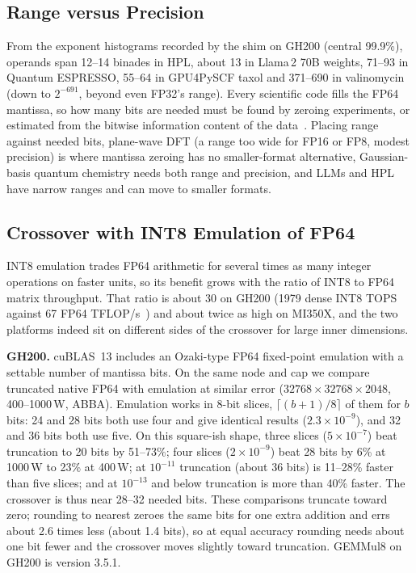 \documentclass[conference]{IEEEtran}
\newcommand{\W}{\,W}
\newcommand{\ee}[2]{#1{\times}10^{#2}}  %
\newcommand{\pct}{\%}
\begin{document}
\subsection{Range versus Precision}\label{sec:range}

From the exponent histograms recorded by the shim on GH200 (central 99.9\pct), operands span 12--14 binades in HPL,
about 13 in Llama\,2 70B weights, 71--93 in Quantum ESPRESSO, 55--64 in GPU4PySCF taxol and 371--690 in valinomycin
(down to $2^{-691}$, beyond even FP32's range). Every scientific code fills the FP64 mantissa, so how many bits are
needed must be found by zeroing experiments, or estimated from the bitwise information content of the
data~\cite{Klower2021}. Placing range against needed bits, plane-wave DFT (a range too wide for FP16 or FP8, modest
precision) is where mantissa zeroing has no smaller-format alternative, Gaussian-basis quantum chemistry needs both
range and precision, and LLMs and HPL have narrow ranges and can move to smaller formats.

\subsection{Crossover with INT8 Emulation of FP64}\label{sec:crossover}

INT8 emulation trades FP64 arithmetic for several times as many integer operations on faster units, so its benefit
grows with the ratio of INT8 to FP64 matrix throughput. That ratio is about 30 on GH200 (1979 dense INT8 TOPS against
67 FP64 TFLOP/s~\cite{NVIDIAGH200}) and about twice as high on MI350X, and the two platforms indeed sit on different
sides of the crossover for large inner dimensions.

\textbf{GH200.} cuBLAS~13 includes an Ozaki-type FP64 fixed-point emulation with a settable number of mantissa bits.
On the same node and cap we compare truncated native FP64 with emulation at similar error
($32768{\times}32768{\times}2048$, 400--1000\W, ABBA). Emulation works in 8-bit slices, $\lceil(b+1)/8\rceil$ of them for
$b$ bits: 24 and 28 bits both use four and give identical results ($\ee{2.3}{-9}$), and 32 and 36 bits both use five. On
this square-ish shape, three slices ($\ee{5}{-7}$) beat truncation to 20 bits by 51--73\pct; four slices
($\ee{2}{-9}$) beat 28 bits by 6\pct{} at 1000\W{} to 23\pct{} at 400\W; at $10^{-11}$ truncation (about 36 bits) is
11--28\pct{} faster than five slices; and at $10^{-13}$ and below truncation is more than 40\pct{} faster. The crossover is
thus near 28--32 needed bits. These comparisons truncate toward zero; rounding to nearest zeroes the same bits for one
extra addition and errs about 2.6 times less (about 1.4 bits), so at equal accuracy rounding needs about one bit fewer
and the crossover moves slightly toward truncation. GEMMul8 on GH200 is version 3.5.1.
\end{document}
